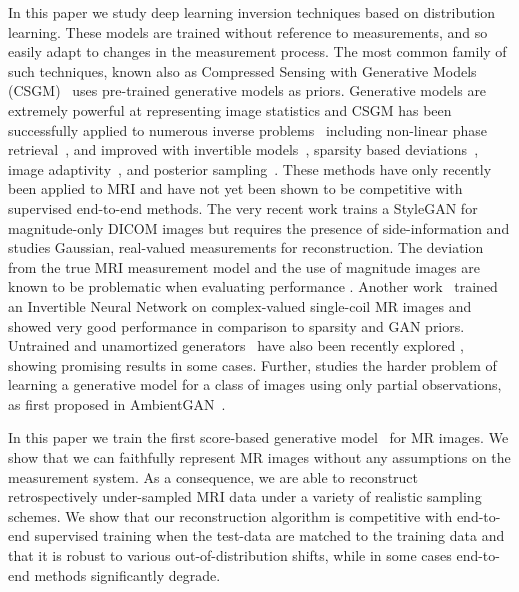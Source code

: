 In this paper we study deep learning inversion techniques based on
distribution learning.  These models are trained without reference to
measurements, and so easily adapt to changes in the measurement
process.  The most common family of such techniques, known also as
Compressed Sensing with Generative Models
(CSGM)~\cite{bora2017compressed} uses pre-trained generative models as
priors.  Generative models are extremely powerful at representing
image statistics and CSGM has been successfully applied to numerous
inverse problems~\cite{bora2017compressed,hand2019global} including
non-linear phase retrieval~\cite{hand2018phase}, and improved with
invertible models~\cite{asim2019invertible}, sparsity based
deviations~\cite{dhar2018modeling}, image
adaptivity~\cite{hussein2020image}, and posterior
sampling~\cite{song2019generative, jalal2021instance}.  These methods
have only recently been applied to MRI and have not yet been shown to
be competitive with supervised end-to-end methods.  The very recent
work \cite{kelkar2021prior} trains a StyleGAN for magnitude-only DICOM
images but requires the presence of side-information and studies
Gaussian, real-valued measurements for reconstruction.  The deviation
from the true MRI measurement model and the use of magnitude images
are known to be problematic when evaluating performance
\cite{shimron2021subtle}.  Another work~\cite{kelkar2021compressible}
trained an Invertible Neural Network on complex-valued single-coil MR
images and showed very good performance in comparison to sparsity and
GAN priors.  Untrained and unamortized
generators~\cite{heckel2018deep} have also been recently explored
\cite{darestani2021measuring}, showing promising results in some
cases. Further, \cite{cole2021fast} studies the harder problem of
learning a generative model for a class of images using only partial
observations, as first proposed in
AmbientGAN~\cite{bora2018ambientgan}.


In this paper we train the first score-based generative
model~\cite{song2020improved} for MR images. We show that we can
faithfully represent MR images without any assumptions on the
measurement system. As a consequence, we are able to reconstruct
retrospectively under-sampled MRI data under a variety of realistic
sampling schemes. We show that our reconstruction algorithm is
competitive with end-to-end supervised training when the test-data are
matched to the training data and that it is robust to various
out-of-distribution shifts, while in some cases end-to-end methods
significantly degrade. 


